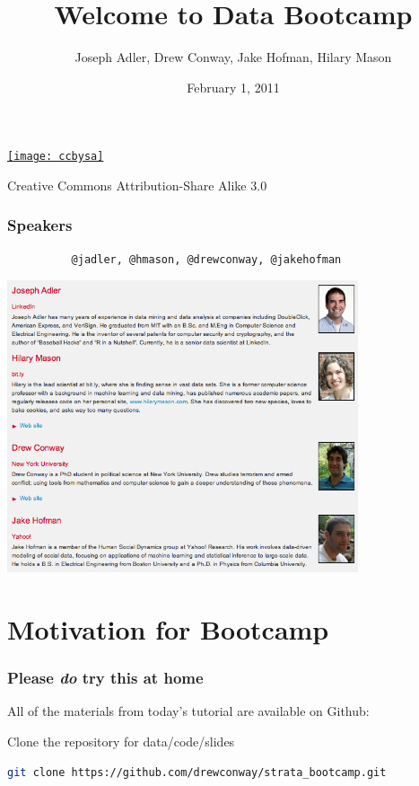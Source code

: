 \documentclass[xcolor=dvipsnames, 9pt]{beamer}
\title{Welcome to Data Bootcamp}
\author{Joseph Adler, Drew Conway, Jake Hofman, Hilary Mason}
\date{February 1, 2011}
\begin{document}
 
    
\begin{frame}[plain]
  \titlepage 

  \tiny
  \href{http://creativecommons.org/licenses/by-sa/3.0/us/}{\texttt{[image: ccbysa]}}

  Creative Commons Attribution-Share Alike 3.0
\end{frame}


\begin{frame}[fragile]
    \frametitle{Speakers}
\begin{verbatim}
          @jadler, @hmason, @drewconway, @jakehofman
\end{verbatim}
    \vskip5pt
    \begin{center}
        \includegraphics[width=0.775\textwidth]{speakers.png} \\
    \end{center}
\end{frame}


\section{Motivation for Bootcamp} %
\label{sec:motivation_for_bootcamp}

\begin{frame}[fragile]
    \frametitle{Please \textit{do} try this at home}
    All of the materials from today's tutorial are available on Github:
    \vskip20pt
    \begin{block}{Clone the repository for data/code/slides}
        \begin{lstlisting}[language=bash]
git clone https://github.com/drewconway/strata_bootcamp.git
        \end{lstlisting}
    \end{block}
\end{frame}
\end{document}
